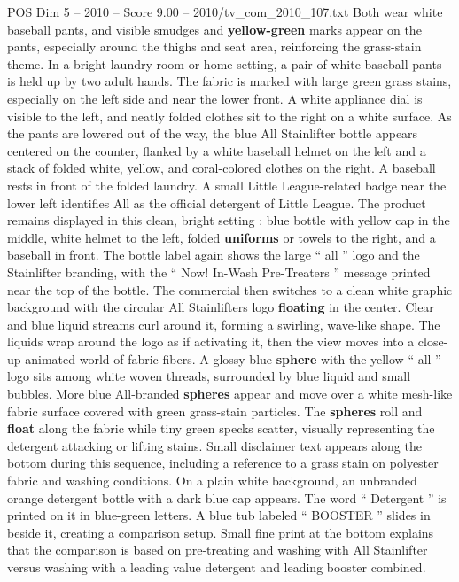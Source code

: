 \begin{textsample}{POS Dim 5 – 2010 – Score 9.00 – 2010/tv\_com\_2010\_107.txt}
Both wear white baseball pants, and visible smudges and \textbf{yellow-green} marks appear on the pants, especially around the thighs and seat area, reinforcing the grass-stain theme.
In a bright laundry-room or home setting, a pair of white baseball pants is held up by two adult hands.
The fabric is marked with large green grass stains, especially on the left side and near the lower front.
A white appliance dial is visible to the left, and neatly folded clothes sit to the right on a white surface.
As the pants are lowered out of the way, the blue All Stainlifter bottle appears centered on the counter, flanked by a white baseball helmet on the left and a stack of folded white, yellow, and coral-colored clothes on the right.
A baseball rests in front of the folded laundry.
A small Little League-related badge near the lower left identifies All as the official detergent of Little League.
The product remains displayed in this clean, bright setting : blue bottle with yellow cap in the middle, white helmet to the left, folded \textbf{uniforms} or towels to the right, and a baseball in front.
The bottle label again shows the large “ all ” logo and the Stainlifter branding, with the “ Now!
In-Wash Pre-Treaters ” message printed near the top of the bottle.
The commercial then switches to a clean white graphic background with the circular All Stainlifters logo \textbf{floating} in the center.
Clear and blue liquid streams curl around it, forming a swirling, wave-like shape.
The liquids wrap around the logo as if activating it, then the view moves into a close-up animated world of fabric fibers.
A glossy blue \textbf{sphere} with the yellow “ all ” logo sits among white woven threads, surrounded by blue liquid and small bubbles.
More blue All-branded \textbf{spheres} appear and move over a white mesh-like fabric surface covered with green grass-stain particles.
The \textbf{spheres} roll and \textbf{float} along the fabric while tiny green specks scatter, visually representing the detergent attacking or lifting stains.
Small disclaimer text appears along the bottom during this sequence, including a reference to a grass stain on polyester fabric and washing conditions.
On a plain white background, an unbranded orange detergent bottle with a dark blue cap appears.
The word “ Detergent ” is printed on it in blue-green letters.
A blue tub labeled “ BOOSTER ” slides in beside it, creating a comparison setup.
Small fine print at the bottom explains that the comparison is based on pre-treating and washing with All Stainlifter versus washing with a leading value detergent and leading booster combined.

\end{textsample}
